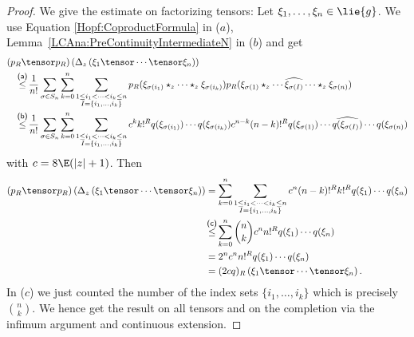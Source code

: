 \begin{proof}
    We give the estimate on factorizing tensors: Let $\xi_1, \ldots, \xi_n \in 
    \lie{g}$. We use Equation \eqref{Hopf:CoproductFormula} in ($a$), 
	Lemma~\ref{LCAna:PreContinuityIntermediateN} in ($b$) and get
    \begin{align*}
        &
        (p_R \tensor p_R) \left(
            \ocoproduct_z
            \left(
                \xi_1 \tensor \cdots \tensor \xi_n
            \right)
        \right)
        \\
        &\quad\ot{(a)}{\leq}
        \frac{1}{n!}
        \sum\limits_{\sigma \in S_n}
        \sum\limits_{k=0}^n
        \sum\limits_{\substack{
            1 \leq i_1 < \cdots < i_k \leq n \\
            I = \{i_1, \ldots, i_k\} }}
        p_R( \xi_{\sigma(i_1)}
        \star_z \cdots \star_z
        \xi_{\sigma(i_k)} )
        p_R( \xi_{\sigma(1)} \star_z
        \cdots
        \widehat{\xi_{\sigma(I)}}
        \cdots
        \star_z \xi_{\sigma(n)} )
        \\
        &\quad\ot{(b)}{\leq}
        \frac{1}{n!}
        \sum\limits_{\sigma \in S_n}
        \sum\limits_{k=0}^n
        \sum\limits_{\substack{
            1 \leq i_1 < \cdots < i_k \leq n \\
            I = \{i_1, \ldots, i_k\} }}
        c^k k!^R
        q(\xi_{\sigma(i_1)})
        \cdots
        q(\xi_{\sigma(i_k)})
        c^{n-k} (n-k)!^R
        q(\xi_{\sigma(1)})
        \cdots
        \widehat{q(\xi_{\sigma(I)})}
        \cdots
        q(\xi_{\sigma(n)})
    \end{align*}
    with $c = 8 \E (|z| + 1)$. Then
    \begin{align*}
    	(p_R \tensor p_R) \left(
            \ocoproduct_z
            \left(
                \xi_1 \tensor \cdots \tensor \xi_n
            \right)
        \right)
        & =
        \sum\limits_{k=0}^n
        \sum\limits_{\substack{
            1 \leq i_1 < \cdots < i_k \leq n \\
            I = \{i_1, \ldots, i_k\} }}
        c^n (n-k)!^R k!^R
        q(\xi_1) \cdots q(\xi_n)
        \\
        & \ot{(c)}{\leq}
        \sum\limits_{k=0}^n
        \binom{n}{k}
        c^n n!^R
        q(\xi_1) \cdots q(\xi_n)
        \\
        & =
        2^n c^n n!^R
        q(\xi_1) \cdots q(\xi_n)
        \\
        & =
        (2c q)_R \left(
            \xi_1 \tensor \cdots \tensor \xi_n
        \right).
    \end{align*}
    In ($c$) we just counted the number of the index sets $\{i_1,
    \ldots, i_k\}$ which is precisely $\binom{n}{k}$. We hence get the result 
    on all tensors and on the completion via the infimum argument and 
    continuous extension.
\end{proof}

